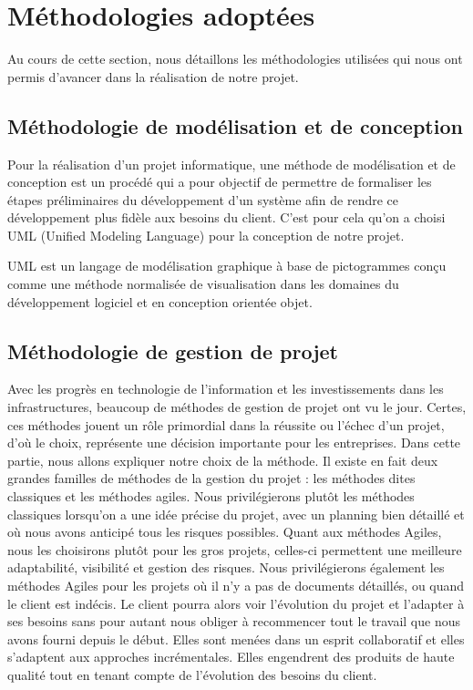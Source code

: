 \section{Méthodologies adoptées}
Au cours de cette section, nous détaillons les méthodologies utilisées qui nous ont permis d'avancer dans la réalisation de notre projet.

\subsection{Méthodologie de modélisation et de conception}
Pour la réalisation d'un projet informatique, une méthode de modélisation et de conception est un procédé qui a pour objectif de permettre de formaliser les étapes préliminaires du développement d'un système afin de rendre ce développement plus fidèle aux besoins du client. C'est pour cela qu'on a choisi UML (Unified Modeling Language) pour la conception de notre projet.\\

\medskip

UML\cite{umlCite} est un langage de modélisation graphique à base de pictogrammes conçu comme une méthode normalisée de visualisation dans les domaines du développement logiciel et en conception orientée objet.



\subsection{Méthodologie de gestion de projet}
Avec les progrès en technologie de l'information et les investissements dans les infrastructures, beaucoup de méthodes de gestion de projet ont vu le jour. Certes, ces méthodes jouent un rôle primordial dans la réussite ou l'échec d'un projet, d'où le choix, représente une décision importante pour les entreprises. Dans cette partie, nous allons expliquer notre choix de la méthode. Il existe en fait deux grandes familles de méthodes de la gestion du projet : les méthodes dites classiques et les méthodes agiles. Nous privilégierons plutôt les méthodes classiques lorsqu'on a une idée précise du projet, avec un planning bien détaillé et où nous avons anticipé tous les risques possibles. Quant aux méthodes Agiles, nous les choisirons plutôt pour les gros projets, celles-ci permettent une meilleure adaptabilité, visibilité et gestion des risques. Nous privilégierons également les méthodes Agiles pour les projets où il n'y a pas de documents détaillés, ou quand le client est indécis. Le client pourra alors voir l'évolution du projet et l'adapter à ses besoins sans pour autant nous obliger à recommencer tout le travail que nous avons fourni depuis le début. Elles sont menées dans un esprit collaboratif et elles s'adaptent aux approches incrémentales. Elles engendrent des produits de haute qualité tout en tenant compte de l'évolution des besoins du client.

